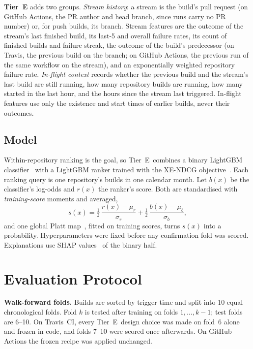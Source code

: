 \documentclass[conference]{IEEEtran}
\newcommand{\tierE}{Tier~E}
\begin{document}
\textbf{\tierE} adds two groups. \emph{Stream history}: a stream is the build's pull request (on GitHub Actions, the PR author and head branch, since runs carry no PR number) or, for push builds, its branch. Stream features are the outcome of the stream's last finished build, its last-5 and overall failure rates, its count of finished builds and failure streak, the outcome of the build's predecessor (on Travis, the previous build on the branch; on GitHub Actions, the previous run of the same workflow on the stream), and an exponentially weighted repository failure rate. \emph{In-flight context} records whether the previous build and the stream's last build are still running, how many repository builds are running, how many started in the last hour, and the hours since the stream last triggered. In-flight features use only the existence and start times of earlier builds, never their outcomes.

\subsection{Model}
Within-repository ranking is the goal, so \tierE\ combines a binary LightGBM classifier~\cite{ke2017lightgbm} with a LightGBM ranker trained with the XE-NDCG objective~\cite{bruch2021alternative}. Each ranking query is one repository's builds in one calendar month. Let $b(x)$ be the classifier's log-odds and $r(x)$ the ranker's score. Both are standardised with \emph{training-score} moments and averaged,
\begin{equation}
s(x) = \tfrac{1}{2}\,\frac{r(x)-\mu_r}{\sigma_r} + \tfrac{1}{2}\,\frac{b(x)-\mu_b}{\sigma_b},
\end{equation}
and one global Platt map~\cite{platt1999probabilistic}, fitted on training scores, turns $s(x)$ into a probability. Hyperparameters were fixed before any confirmation fold was scored. Explanations use SHAP values~\cite{lundberg2017unified} of the binary half.

\section{Evaluation Protocol}

\textbf{Walk-forward folds.} Builds are sorted by trigger time and split into 10 equal chronological folds. Fold $k$ is tested after training on folds $1,\dots,k-1$; test folds are 6--10. On Travis~CI, every \tierE\ design choice was made on fold~6 alone and frozen in code, and folds 7--10 were scored once afterwards. On GitHub Actions the frozen recipe was applied unchanged.
\end{document}
